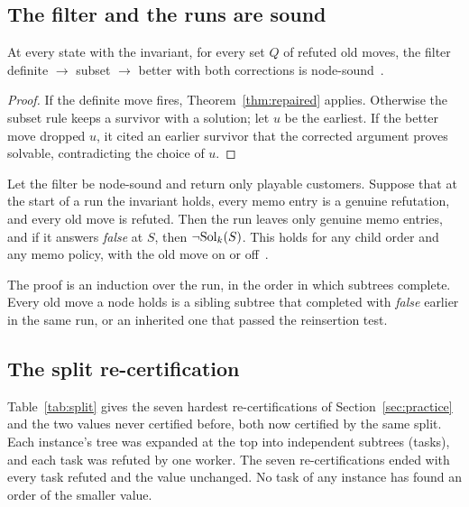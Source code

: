 \subsection{The filter and the runs are sound}
\label{app:machinery}

\begin{proposition}\label{prop:filter}
At every state with the invariant, for every set $Q$ of refuted old moves, the
filter definite $\to$ subset $\to$ better with both corrections is node-sound~.
\end{proposition}
\begin{proof}
If the definite move fires, Theorem~\ref{thm:repaired} applies. Otherwise the
subset rule keeps a survivor with a solution; let $u$ be the earliest. If the
better move dropped $u$, it cited an earlier survivor that the corrected
argument proves solvable, contradicting the choice of $u$.
\end{proof}

\begin{theorem}\label{thm:runs}
Let the filter be node-sound and return only playable customers. Suppose that
at the start of a run the invariant holds, every memo entry is a genuine
refutation, and every old move is refuted. Then the run leaves only genuine memo entries, and if
it answers \emph{false} at $S$, then $\neg\mathrm{Sol}_k(S)$. This holds for any child
order and any memo policy, with the old move on or off~.
\end{theorem}
The proof is an induction over the run, in the order in which subtrees complete.
Every old move a node holds is a sibling subtree that completed with \emph{false}
earlier in the same run, or an inherited one that passed the reinsertion test.

\subsection{The split re-certification}
\label{app:split}

Table~\ref{tab:split} gives the seven hardest re-certifications of
Section~\ref{sec:practice} and the two values never certified before, both now certified by the same split. Each instance's tree was expanded at the top into
independent subtrees (tasks), and each task was refuted by one worker. The
seven re-certifications ended with every task refuted and the value unchanged.
No task of any instance has found an order of the smaller value.

\begin{table}[h]
\centering\small
\caption{All seven hardest values re-certify unchanged, at 18 to 369
core-hours each. The two values never certified before, 21 for \texttt{Random-125-125-2-3\_0}
and 25 for \texttt{Random-125-125-2-2\_0}, are now certified. \emph{Value}: the stored optimum;
\emph{$k$}: the value minus one, which must be refuted. }
\label{tab:split}

\end{table}
